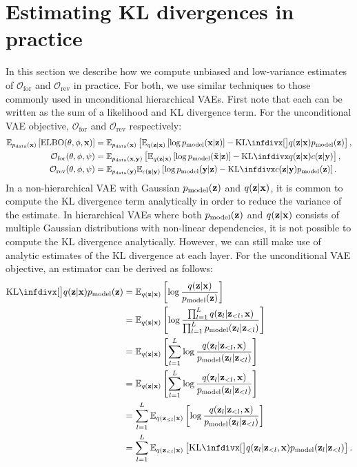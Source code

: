 \section{Estimating KL divergences in practice} \label{supp:cigcvae-kl-estimates}
In this section we describe how we compute unbiased and low-variance estimates
of $\mathcal{O}_\mathrm{for}$ and $\mathcal{O}_\text{rev}$ in practice. For
both, we use similar techniques to those commonly used in unconditional
hierarchical VAEs. First note that each can be written as the sum of a
likelihood and KL divergence term. For the unconditional VAE objective,
$\mathcal{O}_\mathrm{for}$ and $\mathcal{O}_\text{rev}$ respectively:
\begin{align}
  \EX_{\pdata{}(\I{})} \left[ \text{ELBO}(\theta, \phi, \I{}) \right] &= \EX_{\pdata{}(\I{})}\left[ \EX_{q(\z{}|\I{})} \left[ \log\pmodel{}(\I{}|\z{})  \right] - \kl[\big]{q(\z{}|\I{})}{\pmodel{}(\z{})}  \right], \\
  \mathcal{O}_\mathrm{for}(\theta, \phi, \partphi{}) &= \EX_{\pdata{}(\I{}, \partI{})} \left[ \EX_{q(\z{}|\I{})} \left[ \log \pmodel{}(\tildeI{}|\z{}) \right] - \kl{q(\z{}|\I{})}{\partq{}(\z{}|\partI{})} \right], \\
  \mathcal{O}_\text{rev}(\theta, \phi, \partphi{}) &= \EX_{\pdata{}(\partI{})}\EX_{\partq{}(\z{}|\partI{})} \left[ \log\pmodel{}(\partI{}|\z{}) - \kl{\partq{}(\z{}|\partI{})}{\pmodel{}(\z{})} \right].
\end{align}
In a non-hierarchical VAE with Gaussian $p_{\rm{model}}{}(\mathbf{z}{})$ and $q(\mathbf{z}{}|\mathbf{x}{})$, it is
common to compute the KL divergence term analytically in order to reduce the
variance of the estimate. In hierarchical VAEs where both $p_{\rm{model}}{}(\mathbf{z}{})$ and
$q(\mathbf{z}{}|\mathbf{x}{})$ consists of multiple Gaussian distributions with non-linear
dependencies, it is not possible to compute the KL divergence analytically.
However, we can still make use of analytic estimates of the KL divergence at
each layer. For the unconditional VAE objective, an estimator can be derived as
follows:
\begin{align}
  \kl[\big]{q(\z{}|\I{})}{\pmodel{}(\z{})} &= \EX_{q(\z{}|\I{})} \left[ \log \frac{q(\z{}|\I{})}{\pmodel{}(\z{})} \right] \\
                                     &= \EX_{q(\z{}|\I{})} \left[ \log \frac{\prod_{l=1}^L q(\z{}_l|\z{}_{<l}, \I{})}{\prod_{l=1}^L \pmodel{}(\z{}_l|\z{}_{<l})} \right] \\
                                     &= \EX_{q(\z{}|\I{})} \left[ \sum_{l=1}^L \log \frac{q(\z{}_l|\z{}_{<l}, \I{})}{\pmodel{}(\z{}_l|\z{}_{<l})} \right] \\
                                     &= \EX_{q(\z{}|\I{})} \left[ \sum_{l=1}^L \log \frac{q(\z{}_l|\z{}_{<l}, \I{})}{\pmodel{}(\z{}_l|\z{}_{<l})} \right] \\
                                     &= \sum_{l=1}^L \EX_{q(\z{}_{\leq l}|\I{})} \left[ \log \frac{q(\z{}_l|\z{}_{<l}, \I{})}{\pmodel{}(\z{}_l|\z{}_{<l})} \right] \\
                                     &= \sum_{l=1}^L \EX_{q(\z{}_{<l}|\I{})} \left[ \kl[\big]{q(\z{}_l|\z{}_{<l}, \I{})}{\pmodel{}(\z{}_l|\z{}_{<l})} \right].
\end{align}
